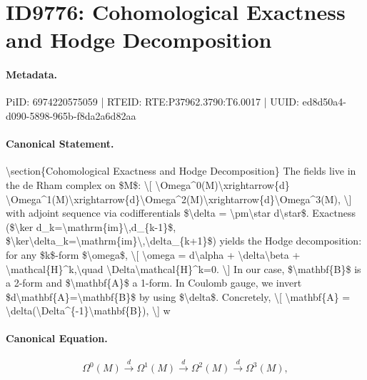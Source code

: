 \section*{ID9776: Cohomological Exactness and Hodge Decomposition}
\paragraph{Metadata.}
PiID: 6974220575059 | RTEID: RTE:P37962.3790:T6.0017 | UUID: ed8d50a4-d090-5898-965b-f8da2a6d82aa

\paragraph{Canonical Statement.}
\textbackslash{}section\{Cohomological Exactness and Hodge Decomposition\} The fields live in the de Rham complex on \$M\$: \textbackslash{}[ \textbackslash{}Omega\textasciicircum{}0(M)\textbackslash{}xrightarrow\{d\} \textbackslash{}Omega\textasciicircum{}1(M)\textbackslash{}xrightarrow\{d\}\textbackslash{}Omega\textasciicircum{}2(M)\textbackslash{}xrightarrow\{d\}\textbackslash{}Omega\textasciicircum{}3(M), \textbackslash{}] with adjoint sequence via codifferentials \$\textbackslash{}delta = \textbackslash{}pm\textbackslash{}star d\textbackslash{}star\$. Exactness (\$\textbackslash{}ker d\_k=\textbackslash{}mathrm\{im\}\textbackslash{},d\_\{k-1\}\$, \$\textbackslash{}ker\textbackslash{}delta\_k=\textbackslash{}mathrm\{im\}\textbackslash{},\textbackslash{}delta\_\{k+1\}\$) yields the Hodge decomposition: for any \$k\$-form \$\textbackslash{}omega\$, \textbackslash{}[ \textbackslash{}omega = d\textbackslash{}alpha + \textbackslash{}delta\textbackslash{}beta + \textbackslash{}mathcal\{H\}\textasciicircum{}k,\textbackslash{}quad \textbackslash{}Delta\textbackslash{}mathcal\{H\}\textasciicircum{}k=0. \textbackslash{}] In our case, \$\textbackslash{}mathbf\{B\}\$ is a 2-form and \$\textbackslash{}mathbf\{A\}\$ a 1-form. In Coulomb gauge, we invert \$d\textbackslash{}mathbf\{A\}=\textbackslash{}mathbf\{B\}\$ by using \$\textbackslash{}delta\$. Concretely, \textbackslash{}[ \textbackslash{}mathbf\{A\} = \textbackslash{}delta(\textbackslash{}Delta\textasciicircum{}\{-1\}\textbackslash{}mathbf\{B\}), \textbackslash{}] w

\paragraph{Canonical Equation.}
\[
\Omega^0(M)\xrightarrow{d} \Omega^1(M)\xrightarrow{d}\Omega^2(M)\xrightarrow{d}\Omega^3(M),
\]

